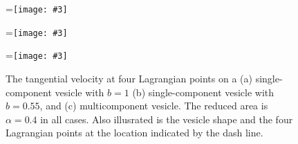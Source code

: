 \documentclass[twoside,twocolumn,9pt]{article}
\newcommand{\subfigimg}[3][,]{%
  \setbox1=\hbox{\texttt{[image: \#3]}}%
  \leavevmode\rlap{\usebox1}%
  \rlap{\hspace*{0pt}\raisebox{\dimexpr\ht1-0\baselineskip}{\bf
  \normalsize #2}}%
  \phantom{\usebox1}%
}
\begin{document}
\begin{figure}[t]
  \centering
  \subfigimg[width=0.3\linewidth,trim=0cm 6cm 28cm 0cm,clip=true]{(a)}{figures/TankTreadingFigs_composite_SC.pdf}
  \subfigimg[width=0.3\linewidth,trim=0cm 6cm 28cm
  0cm,clip=true]{(b)}{figures/TankTreadingFigs_composite_SCp55.pdf}
  \subfigimg[width=0.3\linewidth,trim=0cm 6cm 28cm
  0cm,clip=true]{(c)}{figures/TankTreadingFigs_composite_MCp5.pdf}
  \caption{\label{fig:tankTreadRAp4} \small The tangential velocity at
  four Lagrangian points on a (a) single-component vesicle with $b = 1$
  (b) single-component vesicle with $b = 0.55$, and (c) multicomponent
  vesicle. The reduced area is $\alpha = 0.4$ in all cases. Also
  illusrated is the vesicle shape and the four Lagrangian points at the
  location indicated by the dash line.}
\end{figure}
\end{document}
